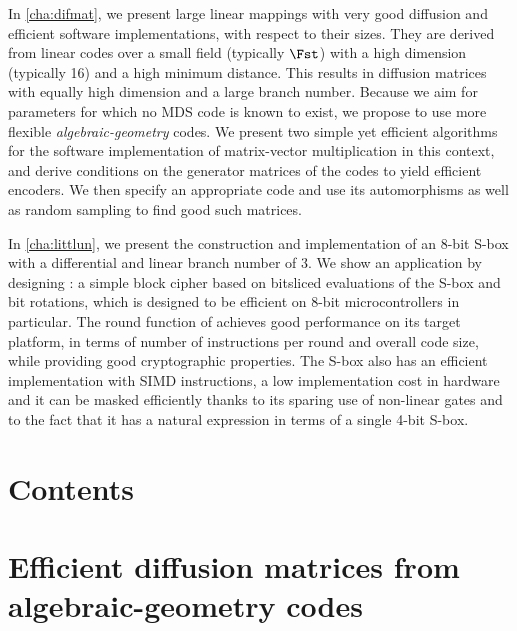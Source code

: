 In \autoref{cha:difmat}, we present large linear mappings with very good diffusion and efficient software implementations,
with respect to their sizes. They are derived from linear codes over a small field (typically $\Fst$) with a high dimension
(typically 16) and a high minimum distance. This results in
diffusion matrices with equally high dimension and a large branch number.
Because we aim for parameters for which no MDS code is known to exist, we propose to use more flexible \emph{algebraic-geometry} codes.
We present two simple yet efficient algorithms for the software implementation of matrix-vector multiplication in this context, and derive
conditions on the generator matrices of the codes to yield efficient encoders. We then specify an appropriate code and use its automorphisms as well as random sampling
to find good such matrices.

In \autoref{cha:littlun}, we present
the construction and implementation of an 8-bit S-box with a differential and linear branch number of 3.
We show an application by designing \littlunpride: a simple block cipher
based on bitsliced evaluations of the S-box and bit rotations, which is designed to be efficient on 8-bit microcontrollers in particular.
The round function of \fly achieves good performance on its target platform, in terms of number of instructions per round and overall
code size, while providing good cryptographic properties.
The S-box also has an efficient implementation with SIMD instructions, a low implementation cost in hardware
and it can be masked efficiently thanks to its sparing use of non-linear gates and to the fact that it has a natural expression in
terms of a single 4-bit S-box.

\cleardoublepage
\chapter*{Contents}
\parttoc



\chapter[Matrices de diffusions issues de codes géométriques]{Efficient diffusion matrices from algebraic-geometry codes}
\label{cha:difmat}

